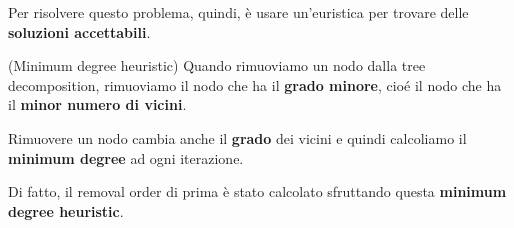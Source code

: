 Per risolvere questo problema, quindi, è usare un'euristica per trovare delle
\textbf{soluzioni accettabili}.

\begin{definition}(Minimum degree heuristic)
    Quando rimuoviamo un nodo dalla tree decomposition, rimuoviamo il nodo che ha il \textbf{grado minore}, cioé il nodo
    che ha il \textbf{minor numero di vicini}.

    Rimuovere un nodo cambia anche il \textbf{grado} dei vicini e quindi calcoliamo
    il \textbf{minimum degree} ad ogni iterazione.
\end{definition}

Di fatto, il removal order di prima è stato calcolato sfruttando questa
\textbf{minimum degree heuristic}. \newpage